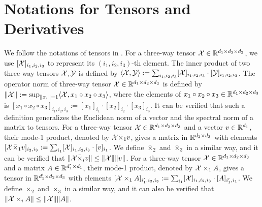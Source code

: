 
\section{Notations for Tensors and Derivatives} \label{apx:tensor}
We follow the notations of tensors in \cite{kolda2009tensor}.
For a three-way tensor ${\mathcal{X}} \in {\mathbb{R}}^{d_1 \times d_2 \times d_3}$,
we use $ [{\mathcal{X}}]_{i_1,i_2,i_3}$ to represent its $(i_1,i_2,i_3)$-th element.
The inner product of two three-way tensors ${\mathcal{X}},{\mathcal{Y}}$ is defined by $\langle {\mathcal{X}}, {\mathcal{Y}} \rangle := \sum_{i_1,i_2,i_3} [{\mathcal{X}}]_{i_1,i_2,i_3} \cdot [{\mathcal{Y}}]_{i_1,i_2,i_3}$. The operator norm of three-way tensor ${\mathcal{X}} \in {\mathbb{R}}^{d_1 \times d_2 \times d_3}$ is defined by $\Vert {\mathcal{X}} \Vert:= \sup_{\Vert x_i \Vert =1} \langle {\mathcal{X}}, x_1 \circ x_2 \circ x_3 \rangle $, where the elements of  $x_1 \circ x_2 \circ x_3 \in {\mathbb{R}}^{d_1 \times d_2 \times d_3}$ is $ [x_1 \circ x_2 \circ x_3]_{i_1,i_2,i_3} := [x_1]_{i_1} \cdot  [x_2]_{i_2} \cdot [x_3]_{i_3} $. 
It can be verified that such a definition generalizes the Euclidean norm of a vector and the spectral norm of a matrix to tensors.
For a three-way tensor  $ {\mathcal{X}} \in {\mathbb{R}}^{d_1 \times d_2 \times d_3}$ and a vector $v \in {\mathbb{R}}^{d_1}$, their mode-1 product, denoted by ${\mathcal{X}} \bar \times_1 v$, gives a matrix in ${\mathbb{R}}^{d_2 \times d_3}$ with elements $ [{\mathcal{X}} \bar \times_1 v]_{i_2,i_3} := \sum_{i_1} [{\mathcal{X}}]_{i_1,i_2,i_3} \cdot [v]_{i_1} $.
We define $\bar \times_2$ and $\bar \times_3$ in a similar way, and it can  be verified that 
$ \Vert {\mathcal{X}} \bar \times_i v \Vert \le \Vert {\mathcal{X}} \Vert \Vert v \Vert$.
For a three-way tensor ${\mathcal{X}} \in {\mathbb{R}}^{d_1 \times d_2 \times d_3}$ and a matrix $A \in {\mathbb{R}}^{d_1' \times d_1}$, their mode-1 product, denoted by $ {\mathcal{X}} \times_1 A$, gives a tensor in ${\mathbb{R}}^{d_1' \times d_2 \times d_3}$ with elements  $ [{\mathcal{X}} \times_1 A]_{i_1',i_2,i_3} := \sum_{i_1} [{\mathcal{X}}]_{i_1,i_2,i_3} \cdot [A]_{i_1',i_1} $. We define $ \times_2$ and $ \times_3$ in a similar way, and it can also be verified that 
$ \Vert {\mathcal{X}} \times_i A \Vert \le \Vert {\mathcal{X}} \Vert \Vert A \Vert$.

